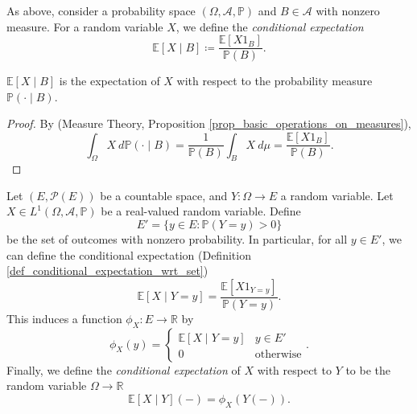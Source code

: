 \documentclass[12pt]{article}
\begin{document}
\begin{definition} %
\label{def_conditional_expectation_wrt_set}
	As above, consider a probability space $(\Omega,\mathcal{A},\mathbb{P})$ and $B\in\mathcal{A}$ with nonzero measure. For a random variable $X$, we define the \emph{conditional expectation}
	\begin{equation*}
		\mathbb{E}[X \mid B] \coloneqq \frac{\mathbb{E}[X1_B]}{\mathbb{P}(B)}.
	\end{equation*}
\end{definition}

\begin{proposition}
\label{prop_conditional_expectation_wrt_set_is_expectation_wrt_conditional_probability_measure}
	$\mathbb{E}[X \mid B]$ is the expectation of $X$ with respect to the probability measure $\mathbb{P}(\cdot \mid B)$.
\end{proposition}
\begin{proof}
	By (Measure Theory, Proposition \ref{prop_basic_operations_on_measures}), 
	\begin{equation*}
		\int_\Omega X\ d\mathbb{P}(\cdot\mid B) = \frac{1}{\mathbb{P}(B)} \int_B X\ d\mu = \frac{\mathbb{E}[X1_B]}{\mathbb{P}(B)}.
	\end{equation*}
\end{proof}

\begin{definition} %
\label{def_conditional_expectation_wrt_countable_rv}
	Let $(E, \mathcal{P}(E))$ be a countable space, and $Y:\Omega \to E$ a random variable. Let $X \in L^1(\Omega, \mathcal{A}, \mathbb{P})$ be a real-valued random variable. Define 
	\begin{equation*}
		E' = \{y \in E : \mathbb{P}(Y=y) > 0 \}
	\end{equation*}
	be the set of outcomes with nonzero probability. In particular, for all $y \in E'$, we can define the conditional expectation (Definition \ref{def_conditional_expectation_wrt_set})
	\begin{equation*}
		\mathbb{E}[X \mid Y=y] = \frac{\mathbb{E}[X1_{Y=y}]}{\mathbb{P}(Y=y)}.
	\end{equation*}
	This induces a function $\phi_X: E \to \mathbb{R}$ by
	\begin{equation*}
		\phi_X(y) = 
		\begin{cases}
			\mathbb{E}[X \mid Y=y] & y\in E' \\
			0 & \text{otherwise}
		\end{cases}.
	\end{equation*}
	Finally, we define the \emph{conditional expectation} of $X$ with respect to $Y$ to be the random variable $\Omega \to \mathbb{R}$
	\begin{equation*}
		\mathbb{E}[X \mid Y](-) = \phi_X(Y(-)).
	\end{equation*}
\end{definition}
\end{document}
